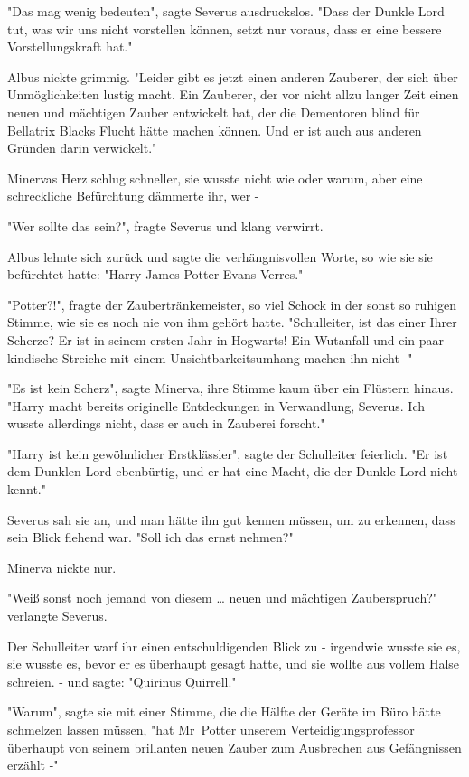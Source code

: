 {"Das mag wenig bedeuten", sagte Severus ausdruckslos. "Dass der Dunkle Lord tut, was wir uns nicht vorstellen können, setzt nur voraus, dass er eine bessere Vorstellungskraft hat."

Albus nickte grimmig. "Leider gibt es jetzt einen anderen Zauberer, der sich über Unmöglichkeiten lustig macht. Ein Zauberer, der vor nicht allzu langer Zeit einen neuen und mächtigen Zauber entwickelt hat, der die Dementoren blind für Bellatrix Blacks Flucht hätte machen können. Und er ist auch aus anderen Gründen darin verwickelt."

Minervas Herz schlug schneller, sie wusste nicht wie oder warum, aber eine schreckliche Befürchtung dämmerte ihr, wer -

"Wer sollte das sein?", fragte Severus und klang verwirrt.

Albus lehnte sich zurück und sagte die verhängnisvollen Worte, so wie sie sie befürchtet hatte: "Harry James Potter-Evans-Verres."

"Potter?!", fragte der Zaubertränkemeister, so viel Schock in der sonst so ruhigen Stimme, wie sie es noch nie von ihm gehört hatte. "Schulleiter, ist das einer Ihrer Scherze? Er ist in seinem ersten Jahr in Hogwarts! Ein Wutanfall und ein paar kindische Streiche mit einem Unsichtbarkeitsumhang machen ihn nicht -"

"Es ist kein Scherz", sagte Minerva, ihre Stimme kaum über ein Flüstern hinaus. "Harry macht bereits originelle Entdeckungen in Verwandlung, Severus. Ich wusste allerdings nicht, dass er auch in Zauberei forscht."

"Harry ist kein gewöhnlicher Erstklässler", sagte der Schulleiter feierlich. "Er ist dem Dunklen Lord ebenbürtig, und er hat eine Macht, die der Dunkle Lord nicht kennt."

Severus sah sie an, und man hätte ihn gut kennen müssen, um zu erkennen, dass sein Blick flehend war. "Soll ich das ernst nehmen?"

Minerva nickte nur.

"Weiß sonst noch jemand von diesem … neuen und mächtigen Zauberspruch?" verlangte Severus.

Der Schulleiter warf ihr einen entschuldigenden Blick zu - irgendwie wusste sie es, sie wusste es, bevor er es überhaupt gesagt hatte, und sie wollte aus vollem Halse schreien. - und sagte: "Quirinus Quirrell."

"Warum", sagte sie mit einer Stimme, die die Hälfte der Geräte im Büro hätte schmelzen lassen müssen, "hat Mr~Potter unserem Verteidigungsprofessor überhaupt von seinem brillanten neuen Zauber zum Ausbrechen aus Gefängnissen erzählt -"

}
